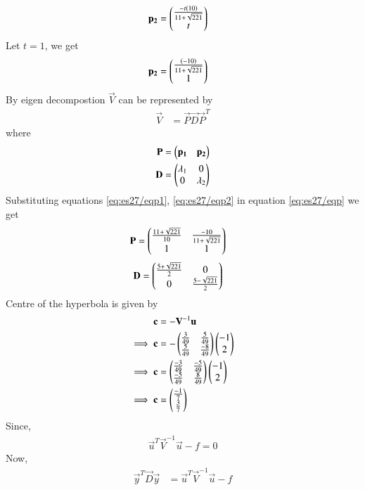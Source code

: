 \documentclass[journal,12pt,twocolumn]{IEEEtran}
\begin{document}
\begin{align}
        \mathbf{p_2}&=\begin{pmatrix}\frac{-t\left(10\right)}{11+\sqrt{221}} \\ t\end{pmatrix}
\end{align}
Let $t=1$, we get 
\begin{align}
    \mathbf{p_2}&=\begin{pmatrix}\frac{\left(-10\right)}{11+\sqrt{221}} \\1 \end{pmatrix}\label{eq:es27/eqp2}
\end{align}
By eigen decompostion $\vec{V}$ can be represented by
\begin{align}
    \vec{V}&=\vec{P}\vec{D}\vec{P}^T\label{eq:es27/eqsubs}
\end{align}
where 
\begin{align}
        \mathbf{P}&=\begin{pmatrix}\mathbf{p_1} & \mathbf{p_2}\end{pmatrix}\label{eq:es27/eqp}\\
    \mathbf{D}&=\begin{pmatrix}\lambda_1 & 0 \\0 & \lambda_2\end{pmatrix}\label{eq:es27/eqD}
\end{align}
Substituting equations \ref{eq:es27/eqp1}, \ref{eq:es27/eqp2} in equation \ref{eq:es27/eqp} we get 
\begin{align}
    \mathbf{P}&=\begin{pmatrix}\frac{11+\sqrt{221}}{10} & \frac{-10}{11+\sqrt{221}} \\1 & 1\end{pmatrix}\label{eq:es27/eqP}
\end{align}
\begin{align}
       \mathbf{D}&=\begin{pmatrix}\frac{5+\sqrt{221}}{2} & 0\\0 & \frac{5-\sqrt{221}}{2}\end{pmatrix}\label{eq:es27/eqDD}
\end{align}
Centre of the hyperbola is given by 
\begin{align}
    \mathbf{c}&=-\mathbf{V}^{-1}\mathbf{u}\\
    \implies\mathbf{c}&=-\begin{pmatrix}\frac{3}{49}&\frac{5}{49}\\\frac{5}{49}&\frac{-8}{49}\end{pmatrix}\begin{pmatrix}-1 \\ 2\end{pmatrix}\\
    \implies\mathbf{c}&=\begin{pmatrix}\frac{-3}{49}&\frac{-5}{49}\\\frac{-5}{49}&\frac{8}{49}\end{pmatrix}\begin{pmatrix}-1 \\ 2\end{pmatrix}\\
    \implies\mathbf{c}&=\begin{pmatrix}\frac{-1}{7}\\\frac{3}{7}\end{pmatrix}
\end{align}
Since,
\begin{align}
    \vec{u}^T\vec{V}^{-1}\vec{u}-f = 0\label{eq:es27/cond}
\end{align} 
Now,
\begin{align}
    \vec{y}^T\vec{D}\vec{y}&=\vec{u}^T\vec{V}^{-1}\vec{u}-f\label{eq:es27/fi}
\end{align}
\end{document}
